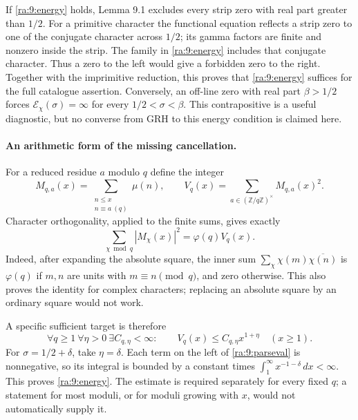 \documentclass[11pt]{article}
\begin{document}
If \eqref{ra:9:energy} holds, Lemma 9.1 excludes every strip zero with
real part greater than $1/2$. For a primitive character the functional
equation reflects a strip zero to one of the conjugate character across
$1/2$; its gamma factors are finite and nonzero inside the strip. The
family in \eqref{ra:9:energy} includes that conjugate character. Thus a
zero to the left would give a forbidden zero to the right. Together with
the imprimitive reduction, this proves that \eqref{ra:9:energy} suffices
for the full catalogue assertion. Conversely, an off-line zero with real
part $\beta>1/2$ forces $\mathcal E_\chi(\sigma)=\infty$ for every
$1/2<\sigma<\beta$. This contrapositive is a useful diagnostic, but no
converse from GRH to this energy condition is claimed here.

\paragraph{An arithmetic form of the missing cancellation.}
For a reduced residue $a$ modulo $q$ define the integer
\[
 M_{q,a}(x)=\sum_{\substack{n\le x\\n\equiv a\ (q)}}\mu(n),
 \qquad V_q(x)=\sum_{a\in(\mathbb Z/q\mathbb Z)^\times}M_{q,a}(x)^2.
\]
Character orthogonality, applied to the finite sums, gives exactly
\begin{equation}\label{ra:9:parseval}
 \sum_{\chi\bmod q}|M_\chi(x)|^2=\varphi(q)V_q(x).
\end{equation}
Indeed, after expanding the absolute square, the inner sum
$\sum_\chi\chi(m)\overline{\chi(n)}$ is $\varphi(q)$ if $m,n$ are units
with $m\equiv n\pmod q$, and zero otherwise. This also proves the identity
for complex characters; replacing an absolute square by an ordinary square
would not work.

A specific sufficient target is therefore
\begin{equation}\label{ra:9:variance}
 \forall q\ge1\ \forall\eta>0\ \exists C_{q,\eta}<\infty:
 \qquad V_q(x)\le C_{q,\eta}x^{1+\eta}\quad(x\ge1).
\end{equation}
For $\sigma=1/2+\delta$, take $\eta=\delta$. Each term on the left of
\eqref{ra:9:parseval} is nonnegative, so its integral is bounded by a
constant times $\int_1^\infty x^{-1-\delta}\,dx<\infty$. This proves
\eqref{ra:9:energy}. The estimate is required separately for every fixed
$q$; a statement for most moduli, or for moduli growing with $x$, would not
automatically supply it.
\end{document}
